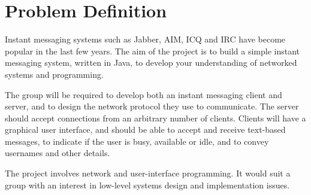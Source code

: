 \section{Problem Definition}
Instant messaging systems such as Jabber, AIM, ICQ and IRC have become popular in the last few years. The aim of the project is to build a simple instant messaging system, written in Java, to develop your understanding of networked systems and programming.

The group will be required to develop both an instant messaging client and server, and to design the network protocol they use to communicate. The server should accept connections from an arbitrary number of clients. Clients will have a graphical user interface, and should be able to accept and receive text-based messages, to indicate if the user is busy, available or idle, and to convey usernames and other details.

The project involves network and user-interface programming. It would suit a group with an interest in low-level systems design and implementation issues.
